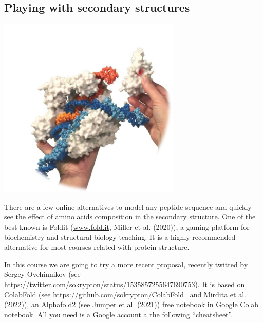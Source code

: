 \documentclass[
  letterpaper,
  DIV=11,
  numbers=noendperiod]{scrreprt}
\begin{document}
\hypertarget{playing-with-secondary-structures}{%
\subsection{Playing with secondary
structures}\label{playing-with-secondary-structures}}

\includegraphics{./pics/handson.png}

There are a few online alternatives to model any peptide sequence and
quickly see the effect of amino acids composition in the secondary
structure. One of the best-known is Foldit
(\href{http://www.fold.it}{www.fold.it}, Miller et al. (2020)), a gaming
platform for biochemistry and structural biology teaching. It is a
highly recommended alternative for most courses related with protein
structure.

In this course we are going to try a more recent proposal, recently
twitted by Sergey Ovchinnikov (see
\url{https://twitter.com/sokrypton/status/1535857255647690753}). It is
based on ColabFold (see \url{https://github.com/sokrypton/ColabFold}~
and Mirdita et al. (2022)), an Alphafold2 (see Jumper et al. (2021))
free notebook in \href{https://colab.research.google.com/?hl=en}{Google
Colab notebook}. All you need is a Google account a the following
``cheatsheet''.
\end{document}
